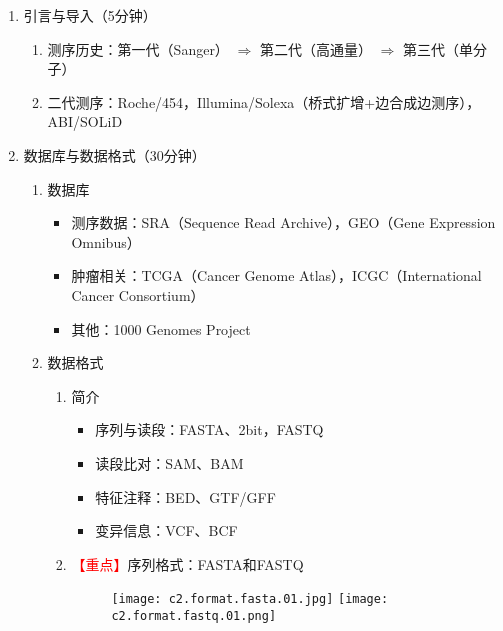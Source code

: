\documentclass{TIJMUjiaoanLL}
\begin{document}
\begin{enumerate}
  \item 引言与导入（5分钟）
    \begin{enumerate}
      \item 测序历史：第一代（Sanger） $\Rightarrow$ 第二代（高通量） $\Rightarrow$ 第三代（单分子）
      \item 二代测序：Roche/454，Illumina/Solexa（桥式扩增+边合成边测序），ABI/SOLiD
    \end{enumerate}

  \item 数据库与数据格式（30分钟）
    \begin{enumerate}
      \item 数据库
        \begin{itemize}
          \item 测序数据：SRA（Sequence Read Archive），GEO（Gene Expression Omnibus）
          \item 肿瘤相关：TCGA（Cancer Genome Atlas），ICGC（International Cancer Consortium）
          \item 其他：1000 Genomes Project
        \end{itemize}
      \item 数据格式
        \begin{enumerate}
          \item 简介
            \begin{itemize}
              \item 序列与读段：FASTA、2bit，FASTQ
              \item 读段比对：SAM、BAM
              \item 特征注释：BED、GTF/GFF
              \item 变异信息：VCF、BCF
            \end{itemize}
          \item \textcolor{red}{【重点】}序列格式：FASTA和FASTQ
            \vspace{-0.5em}
            \begin{figure}[h]
              \centering
              \texttt{[image: c2.format.fasta.01.jpg]}
              \quad
              \texttt{[image: c2.format.fastq.01.png]}
            \end{figure}
            \begin{itemize}
            \vspace{-0.5em}

\end{itemize}
\end{enumerate}
\end{enumerate}
\end{enumerate}
\end{document}
